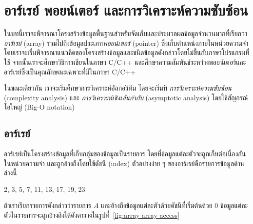 \chapter{อาร์เรย์ พอยน์เตอร์ และ{\wbr}การ{\wbr}วิเคราะห์{\wbr}ความ{\wbr}ซับซ้อน}

ใน{\wbr}บท{\wbr}นี้{\wbr}เรา{\wbr}จะ{\wbr}พิจารณา{\wbr}โครงสร้าง{\wbr}ข้อมูล{\wbr}พื้นฐาน{\wbr}สำหรับ{\wbr}จัด{\wbr}เก็บ{\wbr}และ{\wbr}ประมวลผล{\wbr}ข้อมูล{\wbr}จำนวน{\wbr}มาก{\wbr}ที่{\wbr}เรียก{\wbr}ว่า{\em
อาร์เรย์} (array) รวม{\wbr}ไป{\wbr}ถึง{\wbr}ข้อมูล{\wbr}ประเภท{\em พอยน์เตอร์} (pointer)
ซึ่ง{\wbr}เก็บ{\wbr}ตำแหน่ง{\wbr}ภายใน{\wbr}หน่วยความจำ{\wbr}
โดย{\wbr}เรา{\wbr}จะ{\wbr}เริ่ม{\wbr}พิจารณา{\wbr}แนว{\wbr}คิด{\wbr}ของ{\wbr}โครงสร้าง{\wbr}ข้อมูล{\wbr}และ{\wbr}ชนิด{\wbr}ข้อมูล{\wbr}ดังกล่าว{\wbr}โดย{\wbr}ไม่{\wbr}ขึ้น{\wbr}กับ{\wbr}ภาษา{\wbr}โปรแกรม{\wbr}ที่{\wbr}ใช้{\wbr}
จากนั้น{\wbr}เรา{\wbr}จะ{\wbr}ศึกษา{\wbr}วิธีการ{\wbr}เขียน{\wbr}ใน{\wbr}ภาษา C/C++
และ{\wbr}ศึกษา{\wbr}ความ{\wbr}สัมพันธ์{\wbr}ระหว่าง{\wbr}พอยน์เตอร์{\wbr}และ{\wbr}อาร์เรย์{\wbr}ซึ่ง{\wbr}เป็นคุณ{\wbr}ลักษณะ{\wbr}เฉพาะที่{\wbr}มี{\wbr}ใน{\wbr}ภาษา C/C++

ใน{\wbr}ขณะเดียวกัน เรา{\wbr}จะ{\wbr}เริ่ม{\wbr}ศึกษา{\wbr}การ{\wbr}วิเคราะห์{\wbr}อัล{\wbr}กอ{\wbr}ริ{\wbr}ทึม โดย{\wbr}จะ{\wbr}เริ่ม{\wbr}ที่{\em
  การ{\wbr}วิเคราะห์{\wbr}ความ{\wbr}ซับซ้อน} (complexity analysis) และ{\em
  การ{\wbr}วิเคราะห์{\wbr}เชิง{\wbr}เส้น{\wbr}กำกับ} (asymptotic analysis) โดย{\wbr}ใช้{\wbr}สัญกรณ์{\wbr}โอ{\wbr}ใหญ่ (Big-O
notation)

\section{อาร์เรย์}
อาร์เรย์เป็น{\wbr}โครงสร้าง{\wbr}ข้อมูล{\wbr}ที่{\wbr}เก็บ{\wbr}กลุ่ม{\wbr}ของ{\wbr}ข้อมูล{\wbr}เป็น{\wbr}รายการ{\wbr}
โดย{\wbr}ที่{\wbr}ข้อมูล{\wbr}แต่ละ{\wbr}ตัว{\wbr}จะ{\wbr}ถูก{\wbr}เก็บ{\wbr}ต่อเนื่อง{\wbr}กัน{\wbr}ใน{\wbr}หน่วยความจำ และ{\wbr}ถูก{\wbr}อ้าง{\wbr}ถึง{\wbr}โดย{\wbr}ใช้{\wbr}ดัชนี (index)
ตัวอย่าง{\wbr}ง่าย ๆ ของ{\wbr}อาร์เรย์{\wbr}คือ{\wbr}รายการ{\wbr}ข้อมูล{\wbr}ด้าน{\wbr}ล่าง{\wbr}นี้{\wbr}

\begin{center}
2, 3, 5, 7, 11, 13, 17, 19, 23
\end{center}

ถ้า{\wbr}เรา{\wbr}เรียก{\wbr}รายการ{\wbr}ดังกล่าว{\wbr}ว่า{\wbr}รายการ $A$ และ{\wbr}อ้าง{\wbr}ถึง{\wbr}ข้อมูล{\wbr}แต่ละ{\wbr}ตัว{\wbr}ด้วย{\wbr}ดัชนี{\wbr}ที่{\wbr}เริ่มต้น{\wbr}ด้วย 0
ข้อมูล{\wbr}แต่ละ{\wbr}ตัว{\wbr}ใน{\wbr}รายการ{\wbr}จะ{\wbr}ถูก{\wbr}อ้าง{\wbr}ถึง{\wbr}ได้{\wbr}ดัง{\wbr}ตาราง{\wbr}ใน{\wbr}รูป{\wbr}ที่~\ref{fig:array-array-access}

